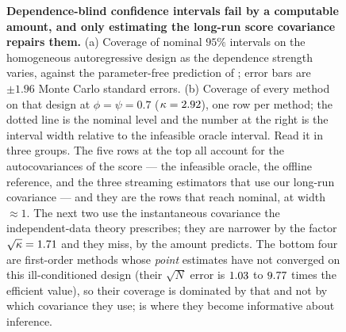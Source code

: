 \begin{figure}[tbp]
\centering
{}
\caption{\textbf{Dependence-blind confidence intervals fail by a computable amount, and
only estimating the long-run score covariance repairs them.}
(a) Coverage of nominal $95\%$ intervals on the homogeneous autoregressive design as the
dependence strength varies, against the parameter-free prediction of
; error bars are $\pm1.96$ Monte Carlo standard errors.
(b) Coverage of every method on that design at $\phi=\psi=0.7$ ($\kappa=2.92$), one row
per method; the dotted line is the nominal level and the number at the right is the interval width
relative to the infeasible oracle interval. Read it in three groups. The five rows at the top all
account for the autocovariances of the score --- the infeasible oracle, the offline reference, and
the three streaming estimators that use our long-run covariance --- and they are the rows that
reach nominal, at width $\approx1$. The next two use the instantaneous covariance the
independent-data theory prescribes; they are narrower by the factor $\sqrt\kappa=1.71$
and they miss, by the amount  predicts. The bottom four are first-order methods
whose \emph{point} estimates have not converged on this ill-conditioned design (their $\sqrt N$
error is $1.03$ to $9.77$ times the efficient value), so their coverage is
dominated by that and not by which covariance they use;  is where they become
informative about inference.}
\label{fig:coverage}
\end{figure}
